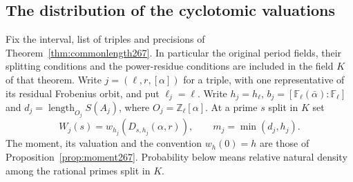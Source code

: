 \documentclass[a4paper,11pt]{article}
\theoremstyle{definition}
\theoremstyle{remark}
\numberwithin{equation}{section}
\begin{document}
\subsection{The distribution of the cyclotomic valuations}\label{nav:III-47}
Fix the interval, list of triples and precisions of
Theorem~\ref{thm:commonlength267}. In particular the original
period fields, their splitting conditions and the power-residue
conditions are included in the field \(K\) of that theorem.
Write \(j=(\ell,r,[\alpha])\) for a triple, with one
representative of its residual Frobenius orbit, and put \(\ell_j=\ell\). Write
\(h_j=h_\ell\), \(b_j=[\mathbb F_\ell(\bar\alpha):\mathbb F_\ell]\)
and \(d_j=\operatorname{length}_{O_j}S(A_j)\), where
\(O_j=\mathbb Z_\ell[\alpha]\). At a prime \(s\) split in \(K\) set
\[
 W_j(s)=w_{h_j}(D_{s,h_j}(\alpha,r)),\qquad
 m_j=\min(d_j,h_j).
\]
The moment, its valuation and the convention \(w_h(0)=h\)
are those of Proposition~\ref{prop:moment267}. Probability
below means relative natural density among the rational
primes split in \(K\).
\end{document}
